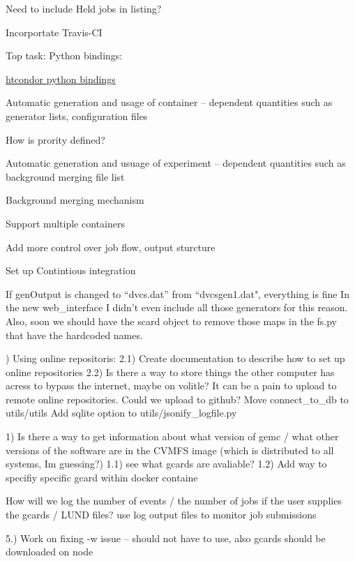 
Need to include Held jobs in listing?

Incorportate Travis-CI

Top task: Python bindings: 

\href{https://htcondor.readthedocs.io/en/latest/apis/python-bindings/}{htcondor python bindings}


Automatic generation and usage of container – dependent quantities such as generator lists, configuration files

How is prority defined?

Automatic generation and usuage of experiment – dependent quantities such as background merging file list 


Background merging mechanism


Support multiple containers


Add more control over job flow, output sturcture

Set up Contintious integration



If genOutput is changed to “dvcs.dat” from “dvcsgen1.dat", everything is fine
In the new web_interface I didn’t even include all those generators for this reason. Also, soon we should have the scard object to remove those maps in the fs.py that have the hardcoded names.



) Using online repositoris:
	2.1) Create documentation to describe how to set up online repositories
	2.2) Is there a way to store things the other computer has acress to bypass the internet, maybe on volitle? It can be a pain to upload to remote online repositories. Could we upload to 	github?
Move connect_to_db to utils/utils
Add sqlite option to utils/jsonify_logfile.py



1) Is there a way to get information about what version of gemc / what other versions of the software are in the CVMFS image (which is distributed to all systems, Im guessing?)
	1.1) see what gcards are avaliable?
	1.2) Add way to specifiy specific gcard within docker containe




How will we log the number of events / the number of jobs if the user supplies the gcards / LUND files?
use log output files to monitor job submissions




5.) Work on fixing -w issue -- should not have to use, also gcards should be downloaded on node



